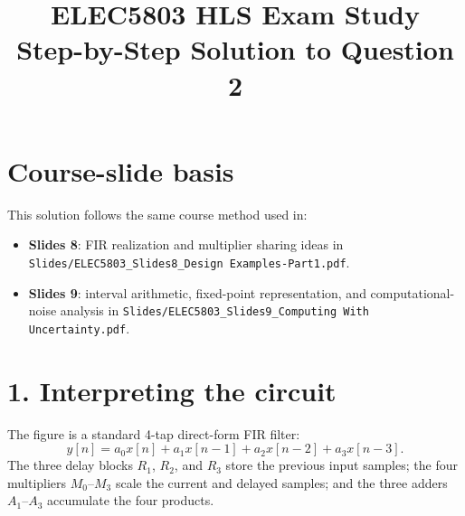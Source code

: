 \documentclass[11pt,a4paper]{article}
\title{ELEC5803 HLS Exam Study\\Step-by-Step Solution to Question 2}
\author{}
\date{}
\begin{document}
\maketitle

\section*{Course-slide basis}
This solution follows the same course method used in:
\begin{itemize}
  \item \textbf{Slides 8}: FIR realization and multiplier sharing ideas in \texttt{Slides/ELEC5803\_Slides8\_Design Examples-Part1.pdf}.
  \item \textbf{Slides 9}: interval arithmetic, fixed-point representation, and computational-noise analysis in \texttt{Slides/ELEC5803\_Slides9\_Computing With Uncertainty.pdf}.
\end{itemize}

\section*{1. Interpreting the circuit}
The figure is a standard 4-tap direct-form FIR filter:
\[
y[n]=a_0x[n]+a_1x[n-1]+a_2x[n-2]+a_3x[n-3].
\]
The three delay blocks $R_1$, $R_2$, and $R_3$ store the previous input samples; the four multipliers $M_0$--$M_3$ scale the current and delayed samples; and the three adders $A_1$--$A_3$ accumulate the four products.
\end{document}
